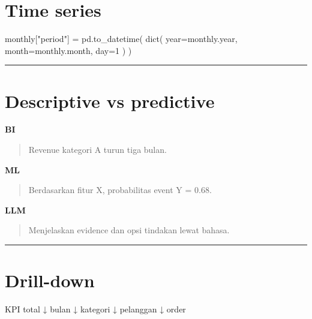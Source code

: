 \documentclass[
  indonesian,
  letterpaper,
  DIV=11,
  numbers=noendperiod]{scrreprt}
\newenvironment{Shaded}{\begin{snugshade}}{\end{snugshade}}
\newcommand{\BuiltInTok}[1]{\textcolor[rgb]{0.00,0.23,0.31}{#1}}
\newcommand{\DecValTok}[1]{\textcolor[rgb]{0.68,0.00,0.00}{#1}}
\newcommand{\NormalTok}[1]{\textcolor[rgb]{0.00,0.23,0.31}{#1}}
\newcommand{\OperatorTok}[1]{\textcolor[rgb]{0.37,0.37,0.37}{#1}}
\newcommand{\StringTok}[1]{\textcolor[rgb]{0.13,0.47,0.30}{#1}}
\begin{document}
\section{Time series}\label{time-series}

\begin{Shaded}
\begin{Highlighting}[]
\NormalTok{monthly[}\StringTok{"period"}\NormalTok{] }\OperatorTok{=}\NormalTok{ pd.to\_datetime(}
    \BuiltInTok{dict}\NormalTok{(}
\NormalTok{        year}\OperatorTok{=}\NormalTok{monthly.year,}
\NormalTok{        month}\OperatorTok{=}\NormalTok{monthly.month,}
\NormalTok{        day}\OperatorTok{=}\DecValTok{1}
\NormalTok{    )}
\NormalTok{)}
\end{Highlighting}
\end{Shaded}

\begin{center}\rule{0.5\linewidth}{0.5pt}\end{center}

\section{Descriptive vs predictive}\label{descriptive-vs-predictive}

\textbf{BI}

\begin{quote}
Revenue kategori A turun tiga bulan.
\end{quote}

\textbf{ML}

\begin{quote}
Berdasarkan fitur X, probabilitas event Y = 0.68.
\end{quote}

\textbf{LLM}

\begin{quote}
Menjelaskan evidence dan opsi tindakan lewat bahasa.
\end{quote}

\begin{center}\rule{0.5\linewidth}{0.5pt}\end{center}

\section{Drill-down}\label{drill-down}

\begin{Shaded}
\begin{Highlighting}[]
\NormalTok{KPI total}
\NormalTok{  ↓}
\NormalTok{bulan}
\NormalTok{  ↓}
\NormalTok{kategori}
\NormalTok{  ↓}
\NormalTok{pelanggan}
\NormalTok{  ↓}
\NormalTok{order}
\end{Highlighting}
\end{Shaded}
\end{document}
